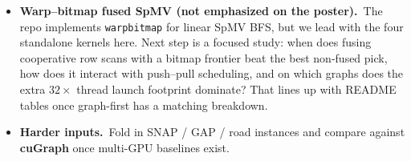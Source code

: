 \documentclass[
    a0paper,
    margin=0.14in,
    innermargin=5mm,
    blockverticalspace=3mm,
    colspace=3mm,
    subcolspace=2mm,
    20pt,
]{tikzposter}
\begin{document}
\begin{columns}
{\begin{itemize}
        \item \textbf{Warp--bitmap fused SpMV (not emphasized on the poster).}\ The
              repo implements \texttt{warpbitmap} for linear SpMV BFS, but we
              lead with the four standalone kernels here. Next step is a focused
              study: when does fusing cooperative row scans with a bitmap
              frontier beat the best non-fused pick, how does it interact with
              push--pull scheduling, and on which graphs does the extra
              $32\times$ thread launch footprint dominate? That lines up with
              README tables once graph-first has a matching breakdown.

        \item \textbf{Harder inputs.}\ Fold in SNAP / GAP / road instances and
              compare against \textbf{cuGraph} once multi-GPU baselines exist.
    \end{itemize}
    \vspace{2.5em}
}

\end{columns}
\end{document}

